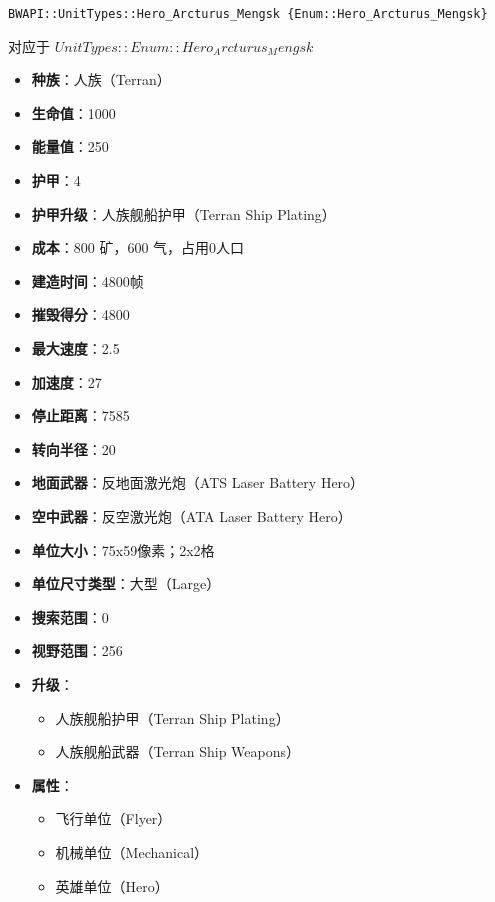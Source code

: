 \begin{tcolorbox}[colback=white, colframe=black!60!white, title=Hero\_Arcturus\_Mengsk(), arc=0mm]
    \begin{verbatim}
BWAPI::UnitTypes::Hero_Arcturus_Mengsk {Enum::Hero_Arcturus_Mengsk}
    \end{verbatim}
    对应于  $ UnitTypes::Enum::Hero_Arcturus_Mengsk $ 
    \begin{itemize}
        \item \textbf{种族}：人族（Terran）
        \item \textbf{生命值}：1000
        \item \textbf{能量值}：250
        \item \textbf{护甲}：4
        \item \textbf{护甲升级}：人族舰船护甲（Terran Ship Plating）
        \item \textbf{成本}：800 矿，600 气，占用0人口
        \item \textbf{建造时间}：4800帧
        \item \textbf{摧毁得分}：4800
        \item \textbf{最大速度}：2.5
        \item \textbf{加速度}：27
        \item \textbf{停止距离}：7585
        \item \textbf{转向半径}：20
        \item \textbf{地面武器}：反地面激光炮（ATS Laser Battery Hero）
        \item \textbf{空中武器}：反空激光炮（ATA Laser Battery Hero）
        \item \textbf{单位大小}：75x59像素；2x2格
        \item \textbf{单位尺寸类型}：大型（Large）
        \item \textbf{搜索范围}：0
        \item \textbf{视野范围}：256
        \item \textbf{升级}：
            \begin{itemize}
                \item 人族舰船护甲（Terran Ship Plating）
                \item 人族舰船武器（Terran Ship Weapons）
            \end{itemize}
        \item \textbf{属性}：
            \begin{itemize}
                \item 飞行单位（Flyer）
                \item 机械单位（Mechanical）
                \item 英雄单位（Hero）
            \end{itemize}
    \end{itemize}
\end{tcolorbox}

